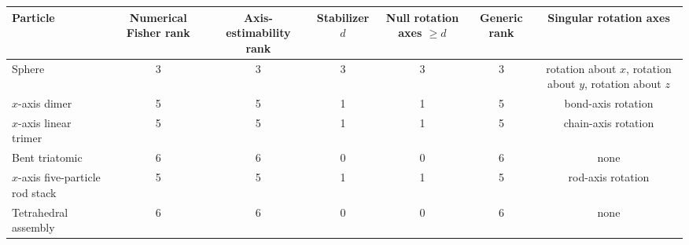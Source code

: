 \begin{tabular}{lcccccc}
\toprule
Particle & Numerical Fisher rank & Axis-estimability rank & Stabilizer $d$ & Null rotation axes $\ge d$ & Generic rank & Singular rotation axes \\
\midrule
Sphere & 3 & 3 & 3 & 3 & 3 & rotation about $x$, rotation about $y$, rotation about $z$ \\
$x$-axis dimer & 5 & 5 & 1 & 1 & 5 & bond-axis rotation \\
$x$-axis linear trimer & 5 & 5 & 1 & 1 & 5 & chain-axis rotation \\
Bent triatomic & 6 & 6 & 0 & 0 & 6 & none \\
$x$-axis five-particle rod stack & 5 & 5 & 1 & 1 & 5 & rod-axis rotation \\
Tetrahedral assembly & 6 & 6 & 0 & 0 & 6 & none \\
\bottomrule
\end{tabular}
